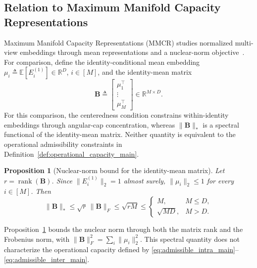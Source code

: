 \documentclass[journal]{IEEEtran}
\newtheorem{proposition}[theorem]{Proposition}
\begin{document}
\begin{bibunit}
\vspace{10pt}

\section{Relation to Maximum Manifold Capacity Representations}
\label{sec:mmcr_surrogates}


Maximum Manifold Capacity Representations (MMCR) studies normalized multi-view embeddings through mean representations and a nuclear-norm objective~\cite{yerxa2023learning,isik2023information,
schaeffer2024towards}. For comparison, define the identity-conditional mean embedding $\mu_i\triangleq\mathbb E[E_i^{(1)}]\in\mathbb R^D$, $i\in[M]$, and the identity-mean matrix
%
\begin{equation}
\mathbf B\triangleq
\begin{bmatrix}
\mu_1^\top\\
\vdots\\
\mu_M^\top
\end{bmatrix}
\in\mathbb R^{M\times D}.
\label{eq:mean_embedding_matrix_main}
\end{equation}
%
For this comparison, the centeredness condition constrains within-identity embeddings through angular-cap concentration, whereas $\|\mathbf B\|_*$ is a spectral functional of the identity-mean matrix. Neither quantity is equivalent to the operational admissibility constraints in Definition~\ref{def:operational_capacity_main}.

 


\begin{proposition}[Nuclear-norm bound for the identity-mean matrix]
\label{prop:nuclear_norm_main}
%
Let $r=\operatorname{rank}(\mathbf B)$. Since $\|E_i^{(1)}\|_2=1$ almost surely, $\|\mu_i\|_2\le1$ for every $i\in[M]$. Then
%
\begin{equation}
\|\mathbf{B}\|_* \le \sqrt{r}\,\|\mathbf{B}\|_F
\le \sqrt{rM} \le
\begin{cases}
M, & M\le D,\\[3pt]
\sqrt{MD}, & M>D.
\end{cases}
\label{eq:nuclear_norm_bound_main}
\end{equation}
%
\end{proposition}




Proposition~\ref{prop:nuclear_norm_main} bounds the nuclear norm through both the matrix rank and the Frobenius norm, with $\|\mathbf B\|_F^2=\sum_i\|\mu_i\|_2^2$. This spectral quantity does not characterize the operational capacity defined by \eqref{eq:admissible_intra_main}--\eqref{eq:admissible_inter_main}.


\end{bibunit}
\end{document}
